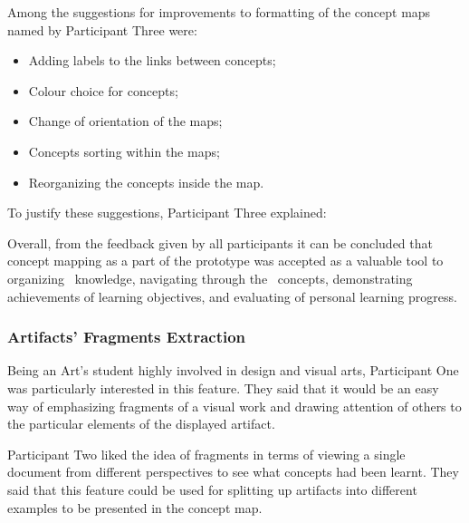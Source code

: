 
Among the suggestions for improvements to formatting of the concept maps
named by Participant Three were:
\begin{itemize}
  \item Adding labels to the links between concepts;
  \item Colour choice for concepts;
  \item Change of orientation of the maps;
  \item Concepts sorting within the maps;
  \item Reorganizing the concepts inside the map.
\end{itemize}

To justify these suggestions, Participant Three explained:


Overall, from the feedback given by all participants it can be concluded that
concept mapping as a part of the prototype was accepted as a valuable tool to
organizing \ep~knowledge, navigating through the \ep~concepts, demonstrating
achievements of learning objectives, and evaluating of personal learning
progress.

\subsubsection{Artifacts' Fragments Extraction}

Being an Art's student highly involved in design and visual arts, Participant
One was particularly interested in this feature. They said that it would be an
easy way of emphasizing fragments of a visual work and drawing attention of
others to the particular elements of the displayed artifact.


Participant Two liked the idea of fragments in terms of viewing a single
document from different perspectives to see what concepts had been learnt. They
said that this feature could be used for splitting up artifacts into different
examples to be presented in the concept map.


